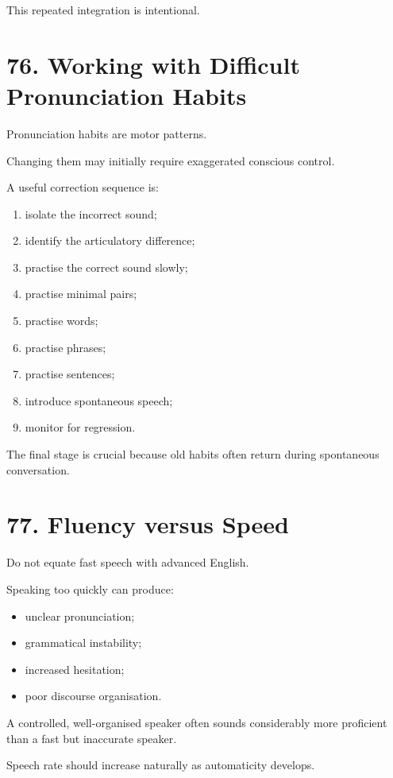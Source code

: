 This repeated integration is intentional.

\section*{76. Working with Difficult Pronunciation Habits}

Pronunciation habits are motor patterns.

Changing them may initially require exaggerated conscious control.

A useful correction sequence is:

\begin{enumerate}
    \item isolate the incorrect sound;
    \item identify the articulatory difference;
    \item practise the correct sound slowly;
    \item practise minimal pairs;
    \item practise words;
    \item practise phrases;
    \item practise sentences;
    \item introduce spontaneous speech;
    \item monitor for regression.
\end{enumerate}

The final stage is crucial because old habits often return during spontaneous conversation.

\section*{77. Fluency versus Speed}

Do not equate fast speech with advanced English.

Speaking too quickly can produce:

\begin{itemize}
    \item unclear pronunciation;
    \item grammatical instability;
    \item increased hesitation;
    \item poor discourse organisation.
\end{itemize}

A controlled, well-organised speaker often sounds considerably more proficient than a fast but inaccurate speaker.

Speech rate should increase naturally as automaticity develops.

